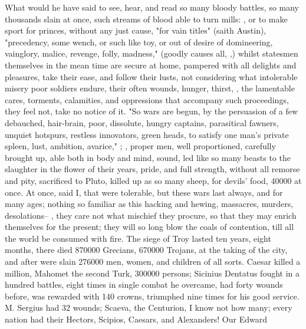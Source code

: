 What would he have said to see, hear, and read so many bloody battles, so many
thousands slain at once, such streams of blood able to turn mills: , or to make sport for princes, without any just cause,
"for vain titles" (saith Austin), "precedency, some wench,
or such like toy, or out of desire of domineering, vainglory, malice, revenge,
folly, madness," (goodly causes all, ,) whilst statesmen themselves in the mean time are secure
at home, pampered with all delights and pleasures, take their ease, and follow
their lusts, not considering what intolerable misery poor soldiers endure,
their often wounds, hunger, thirst, \etc{}, the lamentable cares, torments,
calamities, and oppressions that accompany such proceedings, they feel not,
take no notice of it. "So wars are begun, by the persuasion of a few debauched,
hair-brain, poor, dissolute, hungry captains, parasitical fawners, unquiet
hotspurs, restless innovators, green heads, to satisfy one man's private
spleen, lust, ambition, avarice," \etc{}; , proper men, well proportioned, carefully brought
up, able both in body and mind, sound, led like so many
beasts to the slaughter in the flower of their years,
pride, and full strength, without all remorse and pity, sacrificed to Pluto,
killed up as so many sheep, for devils' food, 40\thinspace{}000 at once. At
once, said I, that were tolerable, but these wars last always, and for many
ages; nothing so familiar as this hacking and hewing, massacres, murders,
desolations-- , they care not what mischief
they procure, so that they may enrich themselves for the present; they will so
long blow the coals of contention, till all the world be consumed with fire.
The siege of Troy lasted ten years, eight months, there
died 870\thinspace{}000 Grecians, 670\thinspace{}000 Trojans, at the taking of
the city, and after were slain 276\thinspace{}000 men, women, and children of
all sorts. Caesar killed a million, Mahomet the second
Turk, 300\thinspace{}000 persons; Sicinius Dentatus fought in a hundred
battles, eight times in single combat he overcame, had forty wounds before, was
rewarded with 140 crowns, triumphed nine times for his good service. M. Sergius
had 32 wounds; Scaeva, the Centurion, I know not how many; every nation had
their Hectors, Scipios, Caesars, and Alexanders! Our Edward
